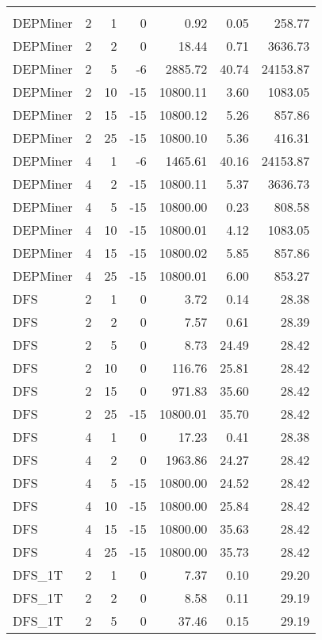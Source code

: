 \begin{center}
\begin{longtable}{lrrrrrr}
\hline\endlastfoot
\\
DEPMiner     & 2 & 1 &   0 & 0.92 & 0.05 & 258.77 \\ 
  DEPMiner     & 2 & 2 &   0 & 18.44 & 0.71 & 3636.73 \\ 
  DEPMiner     & 2 & 5 &  -6 & 2885.72 & 40.74 & 24153.87 \\ 
  DEPMiner     & 2 & 10 & -15 & 10800.11 & 3.60 & 1083.05 \\ 
  DEPMiner     & 2 & 15 & -15 & 10800.12 & 5.26 & 857.86 \\ 
  DEPMiner     & 2 & 25 & -15 & 10800.10 & 5.36 & 416.31 \\ 
  DEPMiner     & 4 & 1 &  -6 & 1465.61 & 40.16 & 24153.87 \\ 
  DEPMiner     & 4 & 2 & -15 & 10800.11 & 5.37 & 3636.73 \\ 
  DEPMiner     & 4 & 5 & -15 & 10800.00 & 0.23 & 808.58 \\ 
  DEPMiner     & 4 & 10 & -15 & 10800.01 & 4.12 & 1083.05 \\ 
  DEPMiner     & 4 & 15 & -15 & 10800.02 & 5.85 & 857.86 \\ 
  DEPMiner     & 4 & 25 & -15 & 10800.01 & 6.00 & 853.27 \\ 
  DFS     & 2 & 1 &   0 & 3.72 & 0.14 & 28.38 \\ 
  DFS     & 2 & 2 &   0 & 7.57 & 0.61 & 28.39 \\ 
  DFS     & 2 & 5 &   0 & 8.73 & 24.49 & 28.42 \\ 
  DFS     & 2 & 10 &   0 & 116.76 & 25.81 & 28.42 \\ 
  DFS     & 2 & 15 &   0 & 971.83 & 35.60 & 28.42 \\ 
  DFS     & 2 & 25 & -15 & 10800.01 & 35.70 & 28.42 \\ 
  DFS     & 4 & 1 &   0 & 17.23 & 0.41 & 28.38 \\ 
  DFS     & 4 & 2 &   0 & 1963.86 & 24.27 & 28.42 \\ 
  DFS     & 4 & 5 & -15 & 10800.00 & 24.52 & 28.42 \\ 
  DFS     & 4 & 10 & -15 & 10800.00 & 25.84 & 28.42 \\ 
  DFS     & 4 & 15 & -15 & 10800.00 & 35.63 & 28.42 \\ 
  DFS     & 4 & 25 & -15 & 10800.00 & 35.73 & 28.42 \\ 
  DFS\_1T     & 2 & 1 &   0 & 7.37 & 0.10 & 29.20 \\ 
  DFS\_1T     & 2 & 2 &   0 & 8.58 & 0.11 & 29.19 \\ 
  DFS\_1T     & 2 & 5 &   0 & 37.46 & 0.15 & 29.19 \\ 

\end{longtable}
\end{center}
